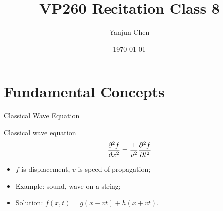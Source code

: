 \documentclass{beamer}
\title[VP260 RC]{VP260 Recitation Class 8} %
\author{Yanjun Chen} %
\institute[UM-SJTU JI] %
{
    University of Michigan - Shanghai Jiao Tong University Joint Institute\\%
\medskip
}
\date{\today} %
\begin{document}
\begin{frame}
    \titlepage %
\end{frame}



\section{Fundamental Concepts} %

\begin{frame}{Classical Wave Equation}
    \begin{block}{Classical wave equation}
        \begin{equation}
            \pdv[2]{f}{x} = \frac{1}{v^2} \pdv[2]{f}{t}
        \end{equation}
    \end{block}
    \vfill
    \begin{itemize}
        \item $f$ is displacement, $v$ is speed of propagation;
        \item Example: sound, wave on a string;
        \item Solution: $f(x, t) = g(x - vt) + h(x + vt)$.
    \end{itemize}
\end{frame}
\end{document}
